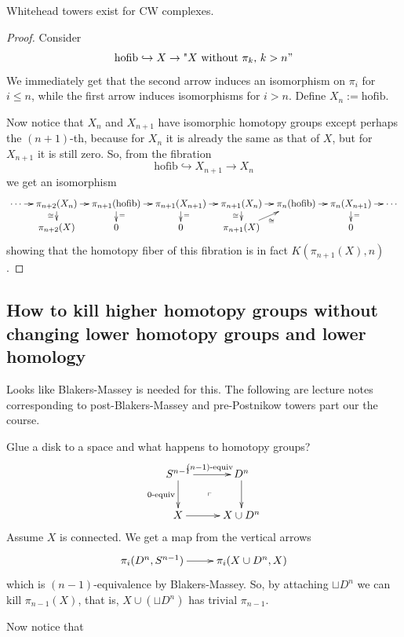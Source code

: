 \begin{lemma}
\label{lemma-white-tower-exist-cw-compl}
Whitehead towers exist for CW complexes.
\end{lemma}
\begin{proof}
	Consider
	$$\text{hofib}\hookrightarrow X\to
	\text{"$X$ without $\pi_{k}$, $k>n$}"$$
	We immediately get that the second arrow
	induces an isomorphism on $\pi_{i}$ for
	$i\leq n$, while the first arrow induces
	isomorphisms for $i>n$. Define $
	X_{n}:=\text{hofib}$.

	Now notice that $X_n$ and $X_{n+1}$ have
	isomorphic homotopy groups except perhaps
	the $(n+1)$-th, because for $X_{n}$ it is
	already the same as that of $X$, but for
	$X_{n+1}$ it is still zero. So, from the
	fibration
	$$\text{hofib} \hookrightarrow X_{n+1}\to
	X_{n}$$
	we get an isomorphism
	$$
	\xymatrix@C=.9em@R=.9em{
		\cdots\ar[r]
		&\pi_{n+2}(X_{n})\ar[r]\ar[d]_{\cong}
		&\pi_{n+1}(\text{hofib} )\ar[d]^{=}\ar[r]
		&\pi_{n+1}(X_{n+1})\ar[r]\ar[d]^{=}
		&\pi_{n+1}(X_{n})\ar[r]\ar[d]_{\cong}
		&\pi_{n}(\text{hofib} )\ar[r]
		&\pi_{n}(X_{n+1})\ar[r]\ar[d]^{=}
		&\cdots\\
		&\pi_{n+2}(X)&0&0
		&\pi_{n+1}(X)\ar[ur]_{\cong}
		&&0&
	}
	$$
	showing that the homotopy fiber of this
	fibration is in fact $K(\pi_{n+1}(X),n)$.

\end{proof}

\subsection{How to kill higher homotopy
groups without changing lower homotopy groups
and lower homology}
\label{subsection-how-kill-highe-homot}

Looks like Blakers-Massey is needed for this.
The following are lecture notes corresponding
to post-Blakers-Massey and pre-Postnikow
towers part our the course.

Glue a disk to a space and what happens to
homotopy groups?
$$
\xymatrix{
	S^{n-1}\ar[r]^{(n-1)\text{-equiv}}\ar[d]
	_{0\text{-equiv}}
	&D^n\ar[d]\\
	X\ar[r]&X\cup D^n\ar@{}[ul]|{\ulcorner}
}
$$
Assume $X$ is connected. We get a map from
the vertical arrows
$$
\xymatrix{
	\pi_i(D^n,S^{n-1})\ar[r]&\pi_i(X\cup D^n,X)
}
$$
which is $(n-1)$-equivalence by
Blakers-Massey. So, by attaching $\sqcup D^n$
we can kill $\pi_{n-1}(X)$, that is,
$X\cup(\sqcup D^n)$ has trivial $\pi_{n-1}$.

Now notice that

